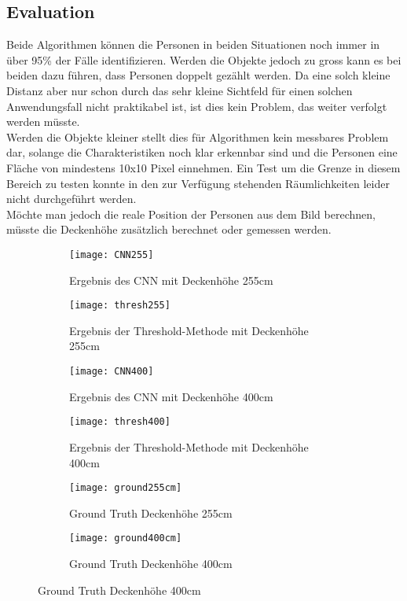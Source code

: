 \subsection{Evaluation}
Beide Algorithmen können die Personen in beiden Situationen noch immer in über 95\% der Fälle identifizieren. Werden die Objekte jedoch zu gross kann es bei beiden dazu führen, dass Personen doppelt gezählt werden. Da eine solch kleine Distanz aber nur schon durch das sehr kleine Sichtfeld für einen solchen Anwendungsfall nicht praktikabel ist, ist dies kein Problem, das weiter verfolgt werden müsste.\\
Werden die Objekte kleiner stellt dies für Algorithmen kein messbares Problem dar, solange die Charakteristiken noch klar erkennbar sind und die Personen eine Fläche von mindestens 10x10 Pixel einnehmen. Ein Test um die Grenze in diesem Bereich zu testen konnte in den zur Verfügung stehenden Räumlichkeiten leider nicht durchgeführt werden.\\
Möchte man jedoch die reale Position der Personen aus dem Bild berechnen, müsste die Deckenhöhe zusätzlich berechnet oder gemessen werden.

\begin{figure}[H]
	\begin{subfigure}{.45\linewidth}
		\centering
		\texttt{[image: CNN255]}
		\caption{Ergebnis des CNN mit Deckenhöhe 255cm}
		\label{fig:cnn255}
	\end{subfigure}\hfill%
	\begin{subfigure}{.45\linewidth}
		\centering
		\texttt{[image: thresh255]}
		\caption{Ergebnis der Threshold-Methode mit Deckenhöhe 255cm}
		\label{fig:thresh255}
	\end{subfigure}\hfill%
	\begin{subfigure}{.45\linewidth}
		\centering
		\texttt{[image: CNN400]}
		\caption{Ergebnis des CNN mit Deckenhöhe 400cm}
		\label{fig:cnn400}
	\end{subfigure}\hfill%
	\begin{subfigure}{.45\linewidth}
		\centering
		\texttt{[image: thresh400]}
		\caption{Ergebnis der Threshold-Methode mit Deckenhöhe 400cm}
		\label{fig:thresh400}
	\end{subfigure}\hfill%
	\begin{subfigure}{.45\linewidth}
		\centering
		\texttt{[image: ground255cm]}
		\caption{Ground Truth Deckenhöhe 255cm}
		\label{fig:ground255}
	\end{subfigure}\hfill%
	\begin{subfigure}{.45\linewidth}
		\centering
		\texttt{[image: ground400cm]}
		\caption{Ground Truth Deckenhöhe 400cm}
		\label{fig:ground400}
	\end{subfigure}
\end{figure}


